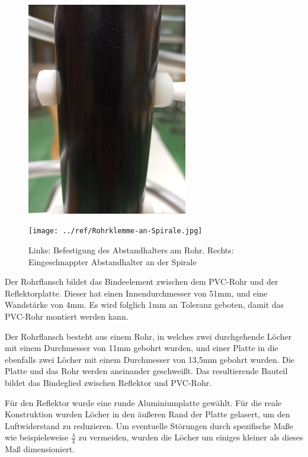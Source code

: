 \begin{figure}[H]
	\begin{minipage}[b]{.4\linewidth} %
		\includegraphics[width=7cm, angle=270]{../ref/Befestigung-Querelement.jpg}
		\label{fig:Abstandhalter-Befestigung}
	\end{minipage}
	\hspace{.1\linewidth}%
	\begin{minipage}[b]{.4\linewidth} %
		\texttt{[image: ../ref/Rohrklemme-an-Spirale.jpg]}
		\label{fig:Seitenelement-an-Spirale}
	\end{minipage}
	\caption{Links: Befestigung des Abstandhalters am Rohr. Rechts: Eingeschnappter Abstandhalter an der Spirale}
\end{figure}

Der Rohrflansch bildet das Bindeelement zwischen dem PVC-Rohr und der Reflektorplatte. Dieser hat einen Innendurchmesser von 51mm, und eine Wandstärke von 4mm. Es wird folglich 1mm an Toleranz geboten, damit das PVC-Rohr montiert werden kann. 

Der Rohrflansch besteht aus einem Rohr, in welches zwei durchgehende Löcher mit einem Durchmesser von 11mm gebohrt wurden, und einer Platte in die ebenfalls zwei Löcher mit einem Durchmesser von 13,5mm gebohrt wurden. Die Platte und das Rohr werden aneinander geschweißt. Das resultierende Bauteil bildet das Bindeglied zwischen Reflektor und PVC-Rohr.

Für den Reflektor wurde eine runde Aluminiumplatte gewählt. Für die reale Konstruktion wurden Löcher in den äußeren Rand der Platte gelasert, um den Luftwiderstand zu reduzieren. Um eventuelle Störungen durch spezifische Maße wie beispielsweise $\frac{\lambda}{4}$ zu vermeiden, wurden die Löcher um einiges kleiner als dieses Maß dimensioniert.

